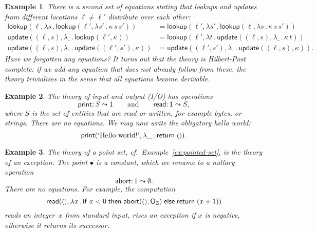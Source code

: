 \documentclass{amsart}
\newcommand{\ZZ}{\mathbb{Z}} %
\newcommand{\lam}[1]{\lambda #1 \,.\,}
\newcommand{\opdecl}[3]{#1 : #2 \leadsto #3} %
\newcommand{\one}{\mathsf{1}} %
\newcommand{\unit}{{\text{\small$()$}}} %
\newcommand{\cond}[3]{\mathsf{if}\;#1\;\mathsf{then}\;#2\;\mathsf{else}\;#3}
\newcommand{\kode}[1]{\mathsf{#1}}
\newcommand{\opcall}[3]{\kode{#1}(#2, #3)}
\newcommand{\return}[1]{\kode{return}\;#1}
\newtheorem{example}{Example}[section]
\begin{document}
\begin{example}
  There is a second set of equations stating that lookups and updates from
  \emph{different} locations $\ell \neq \ell'$ distribute over each other:
  \begin{align*}
    \opcall{lookup}{\ell}{
       \lam{s} \opcall{lookup}{\ell'}{\lam{s'} \kappa \, s \, s'}
    } &=
    \opcall{lookup}{\ell'}{
       \lam{s'} \opcall{lookup}{\ell}{\lam{s} \kappa \, s \, s'}
    }
    \\
    \opcall{update}{(\ell, s)}{
       \lam{\_} \opcall{lookup}{\ell'}{\kappa}
    } &=
    \opcall{lookup}{\ell'}{
       \lam{t} \opcall{update}{(\ell, s)}{
          \lam{\_} \kappa \, t
       }
    } \\
    \opcall{update}{(\ell, s)}{
       \lam{\_} \opcall{update}{(\ell', s')}{\kappa}
    } &=
    \opcall{update}{(\ell', s')}{
       \lam{\_} \opcall{update}{(\ell, s)}{\kappa}
    }.
  \end{align*}
  Have we forgotten any equations?
  It turns out that the theory is Hilbert-Post complete: if we add any equation
  that does not already follow from these, the theory trivializes in the sense
  that all equations become derivable.
\end{example}

\begin{example}
  \label{ex:theory-io}
  The theory of \emph{input and output} (I/O) has operations
  \begin{equation*}
    \opdecl{\kode{print}}{S}{\one}
    \qquad\text{and}\qquad
    \opdecl{\kode{read}}{\one}{S},
  \end{equation*}
  where $S$ is the set of entities that are read or written, for example bytes,
  or strings. There are no equations. We may now write the obligatory hello world:
  \begin{equation*}
    \opcall{print}{\text{`Hello world!'}}{\lam{\_} \return{\unit}}.
  \end{equation*}
\end{example}

\begin{example}
  \label{ex:theory-exception}
  The theory of a point set, cf.\ Example~\ref{ex:pointed-set}, is the theory of
  an \emph{exception}. The point $\bullet$ is a constant, which we rename to a
  nullary operation
  \begin{equation*}
    \opdecl{\kode{abort}}{\one}{\emptyset}.
  \end{equation*}
  There are no equations. For example, the computation
  \begin{equation*}
    \opcall{read}{\unit}{
      \lam{x}{
        \cond{x < 0}{\opcall{abort}{\unit}{\mathsf{O}_\ZZ}}{\return{(x+1)}}
      }
    }
  \end{equation*}
  reads an integer~$x$ from standard input, rises an exception if $x$ is
  negative, otherwise it returns its successor.
\end{example}
\end{document}
